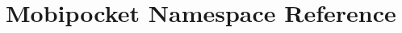 \hypertarget{namespaceMobipocket}{\section{Mobipocket Namespace Reference}
\label{namespaceMobipocket}
}

